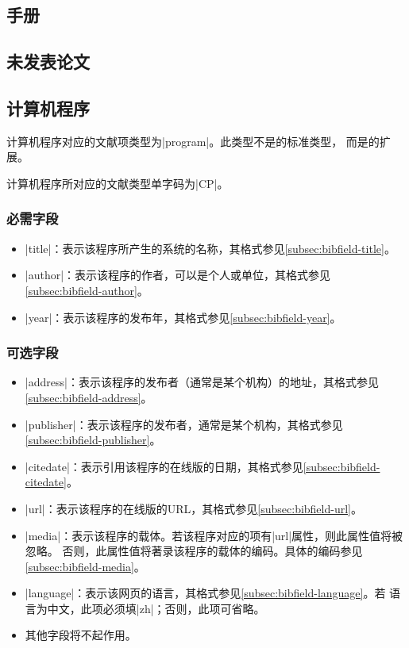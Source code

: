\subsection{手册}\label{subsec:bibtype-manual}

\subsection{未发表论文}\label{subsec:bibtype-unpublished}


\subsection{计算机程序}\label{subsec:bibtype-program}

计算机程序对应的{\BibTeX}文献项类型为|program|。此类型不是{\BibTeX}的标准类型，
而是{\njuthesis}的扩展。

计算机程序所对应的文献类型\cite{gbt3469-1983}单字码为|CP|。

\subsubsection{必需字段}

\begin{itemize}
\item |title|：表示该程序所产生的系统的名称，其格式参见\ref{subsec:bibfield-title}。
\item |author|：表示该程序的作者，可以是个人或单位，其格式参见
  \ref{subsec:bibfield-author}。
\item |year|：表示该程序的发布年，其格式参见\ref{subsec:bibfield-year}。
\end{itemize}

\subsubsection{可选字段}

\begin{itemize}
\item |address|：表示该程序的发布者（通常是某个机构）的地址，其格式参见
  \ref{subsec:bibfield-address}。
\item |publisher|：表示该程序的发布者，通常是某个机构，其格式参见
  \ref{subsec:bibfield-publisher}。
\item |citedate|：表示引用该程序的在线版的日期，其格式参见\ref{subsec:bibfield-citedate}。
\item |url|：表示该程序的在线版的URL，其格式参见\ref{subsec:bibfield-url}。
\item |media|：表示该程序的载体。若该程序对应的{\BibTeX}项有|url|属性，则此属性值将被忽略。
否则，此属性值将著录该程序的载体的编码。具体的编码参见\ref{subsec:bibfield-media}。
\item |language|：表示该网页的语言，其格式参见\ref{subsec:bibfield-language}。若
  语言为中文，此项必须填|zh|；否则，此项可省略。
\item 其他字段将不起作用。
\end{itemize}

